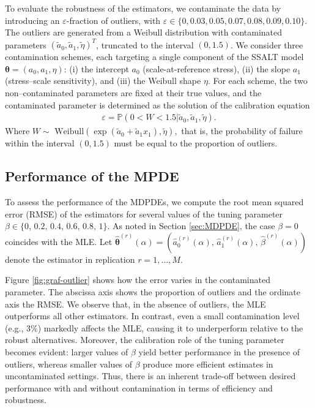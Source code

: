 \documentclass{article}
\begin{document}
To evaluate the robustness of the estimators, we contaminate the data by introducing an $\varepsilon$-fraction of outliers, with
$ \varepsilon \in \{0, 0.03, 0.05, 0.07, 0.08, 0.09, 0.10\}.$
The outliers are generated from a Weibull distribution with contaminated parameters $(\tilde{a}_0, \tilde{a}_1, \tilde{\eta})^T$, truncated to the interval $(0,1.5)$. 
We consider three contamination schemes, each targeting a single component of the SSALT model
\(\boldsymbol{\theta}=(a_0,a_1,\eta)\): (i) the intercept \(a_0\) (scale-at-reference stress),
(ii) the slope \(a_1\) (stress–scale sensitivity), and (iii) the Weibull shape \(\eta\).
For each scheme, the two non–contaminated parameters are fixed at their true values, and the contaminated parameter is determined as the
solution of the calibration equation 
\begin{align*}
\varepsilon = \mathbb{P}(0<W<1.5|\tilde{a}_0, \tilde{a}_1, \tilde{\eta}).
 \end{align*}
  Where $W  \sim \text{ Weibull}(\exp(\tilde{a}_0 + \tilde{a}_1 x_1), \tilde{\eta}),$
that is, the probability of failure within the interval $(0,1.5) $ must be equal to the proportion of outliers. 
\subsection{Performance of the MPDE}

To assess the performance of the MDPDEs, we compute the root mean squared error (RMSE) of the estimators for several values of the tuning parameter
\(\beta \in \{0,\,0.2,\,0.4,\,0.6,\,0.8,\,1\}\). As noted in Section \ref{sec:MDPDE}, the case \(\beta=0\) coincides with the MLE.
Let \(\widehat{\boldsymbol{\theta}}^{(r)}(\alpha)
=(\widehat{a}_0^{(r)}(\alpha),\,\widehat{a}_1^{(r)}(\alpha),\,\widehat{\beta}^{(r)}(\alpha))\)
denote the estimator in replication \(r=1,\ldots,M\).

Figure \ref{fig:graf-outlier} shows how the error varies in the contaminated parameter. The abscissa axis shows the proportion of outliers and the ordinate axis the RMSE. We observe that, in the absence of outliers, the MLE outperforms all other estimators. In contrast, even a small contamination level (e.g., \(3\%\)) markedly affects the MLE, causing it to underperform relative to the robust alternatives.
Moreover, the calibration role of the tuning parameter becomes evident: larger values of \(\beta\) yield better performance in the presence of outliers, whereas smaller values of \(\beta\) produce more efficient estimates in uncontaminated settings. Thus, there is an inherent trade-off between desired performance with and without contamination in terms of efficiency and robustness.
\end{document}
